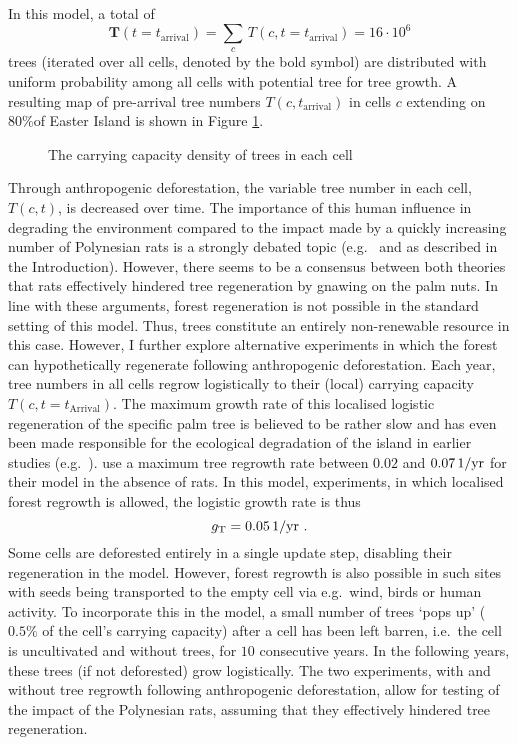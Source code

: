 In this model, a total of 
\begin{equation}
\mathbf{T}(t=t_\text{arrival}) = \sum_{c} \, T(c,t=t_\text{arrival}) =  16 \cdot 10^6
\end{equation} 
trees (iterated over all cells, denoted by the bold symbol) are distributed with uniform probability among all cells with potential tree for tree growth. 
A resulting map of pre-arrival tree numbers $T(c,t_\text{arrival})$ in cells $c$ extending on $80\%$\TODO of Easter Island is shown in Figure \ref{fig:Map_tree}.

\begin{figure}
	\centering
	\caption{The carrying capacity density of trees in each cell}
	\label{fig:Map_tree}
\end{figure}

Through anthropogenic deforestation, the variable tree number in each cell, $T(c,t)$, is decreased over time.
The importance of this human influence in degrading the environment compared to the impact made by a quickly increasing number of Polynesian rats is a strongly debated topic (e.g.\ \citet{Bahn2017} and \citet{Hunt2007} as described in the Introduction).
However, there seems to be a consensus between both theories that rats effectively hindered tree regeneration by gnawing on the palm nuts.
In line with these arguments, forest regeneration is not possible in the standard setting of this model.
Thus, trees constitute an entirely non-renewable resource in this case. 
However, I further explore alternative experiments in which the forest can hypothetically regenerate following anthropogenic deforestation.
Each year, tree numbers in all cells regrow logistically to their (local) carrying capacity $T(c,t=t_\text{Arrival})$.
The maximum growth rate of this localised logistic regeneration of the specific palm tree is believed to be rather slow and has even been made responsible for the ecological degradation of the island in earlier studies (e.g.\ \citet{Brander1998}).
\citet{Brandt2015} use a maximum tree regrowth rate between $0.02$ and $0.07 \, \rm{1/yr}$ for their model in the absence of rats.\TODO
In this model, experiments, in which localised forest regrowth is allowed, the logistic growth rate is thus 
\begin{equation}
g_{\rm T} = 0.05\, \rm{1/yr} \ .
\end{equation}
Some cells are deforested entirely in a single update step, disabling their regeneration in the model. 
However, forest regrowth is also possible in such sites with seeds being transported to the empty cell via e.g.\ wind, birds or human activity.
To incorporate this in the model, a small number of trees `pops up' ($0.5\%$ of the cell's carrying capacity) after a cell has been left barren, i.e.\ the cell is uncultivated and without trees, for $10$ consecutive years.  
In the following years, these trees (if not deforested) grow logistically.
The two experiments, with and without tree regrowth following anthropogenic deforestation, allow for testing of the impact of the Polynesian rats, assuming that they effectively hindered tree regeneration.


